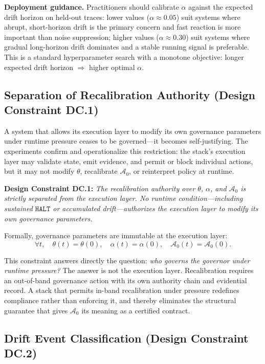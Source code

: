 \documentclass[11pt]{article}
\newcommand{\Azero}{\mathcal{A}_0}
\newcommand{\HALT}{\texttt{HALT}}
\begin{document}
\textbf{Deployment guidance.}
Practitioners should calibrate $\alpha$ against the expected drift horizon
on held-out traces: lower values ($\alpha \approx 0.05$) suit systems
where abrupt, short-horizon drift is the primary concern and fast reaction
is more important than noise suppression;
higher values ($\alpha \approx 0.30$) suit systems where gradual long-horizon
drift dominates and a stable running signal is preferable.
This is a standard hyperparameter search with a monotone objective:
longer expected drift horizon $\Rightarrow$ higher optimal $\alpha$.

\subsection{Separation of Recalibration Authority (Design Constraint DC.1)}

A system that allows its execution layer to modify its own governance
parameters under runtime pressure ceases to be governed---it becomes
self-justifying. The experiments confirm and operationalize this
restriction: the stack's execution layer may validate state, emit
evidence, and permit or block individual actions, but it may not modify
$\theta$, recalibrate $\Azero$, or reinterpret policy at runtime.

\textbf{Design Constraint DC.1:} \emph{The recalibration authority over
$\theta$, $\alpha$, and $\Azero$ is strictly separated from the
execution layer. No runtime condition---including sustained $\HALT$
or accumulated drift---authorizes the execution layer to modify its
own governance parameters.}

Formally, governance parameters are immutable at the execution layer:
\[
  \forall t,\quad \theta(t) = \theta(0),\quad \alpha(t) = \alpha(0),
  \quad \Azero(t) = \Azero(0).
\]

This constraint answers directly the question: \emph{who governs the
governor under runtime pressure?} The answer is not the execution layer.
Recalibration requires an out-of-band governance action with its own
authority chain and evidential record. A stack that permits in-band
recalibration under pressure redefines compliance rather than enforcing it,
and thereby eliminates the structural guarantee that gives $\Azero$ its
meaning as a certified contract.

\subsection{Drift Event Classification (Design Constraint DC.2)}
\end{document}

